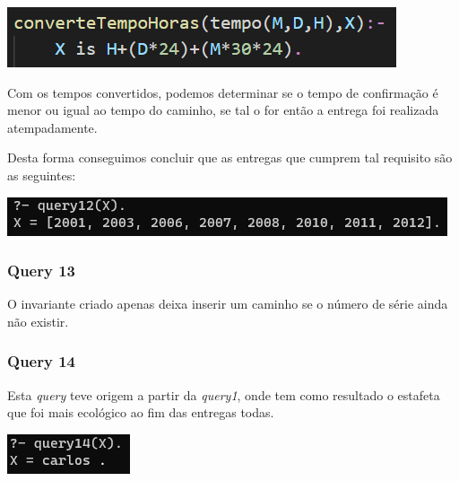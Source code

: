 \documentclass[a4paper,12pt]{article}
\begin{document}
            \begin{center}
                \includegraphics[scale=0.8]{imagens/query12/tempoHoras.png}
            \end{center}
        
            Com os tempos convertidos, podemos determinar se o tempo de confirmação é menor ou igual ao tempo do caminho, se tal o for então a entrega foi realizada atempadamente.\par
            Desta forma conseguimos concluir que as entregas que cumprem tal requisito são as seguintes:\par
    
            \begin{center}
                \includegraphics[scale=0.75]{imagens/query12/query12Res.png}
            \end{center}
        
        \subsubsection{Query 13}
            O invariante criado apenas deixa inserir um caminho se o número de série ainda não existir.
            
           
        \subsubsection{Query 14}
            Esta \emph{query} teve origem a partir da \emph{query1}, onde tem como resultado o estafeta que foi mais ecológico ao fim das entregas todas.\par
            
            \begin{center}
                \includegraphics[scale=1]{imagens/query14.png}
            \end{center}
        
    \newpage
\end{document}
